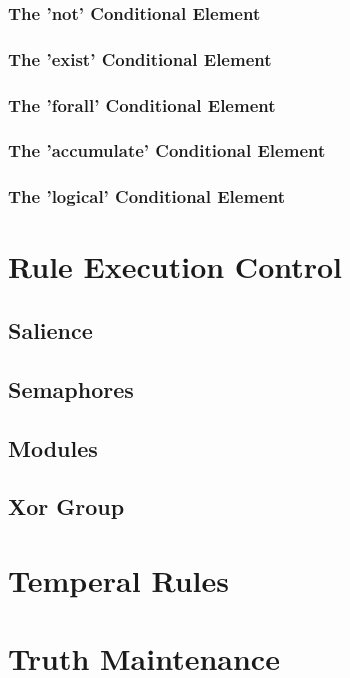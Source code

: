 \subsubsection{The 'not' Conditional Element}
\subsubsection{The 'exist' Conditional Element}
\subsubsection{The 'forall' Conditional Element}
\subsubsection{The 'accumulate' Conditional Element}
\subsubsection{The 'logical' Conditional Element}



\section{Rule Execution Control}
\subsection{Salience}
\subsection{Semaphores}
\subsection{Modules}
\subsection{Xor Group}

\section{Temperal Rules}

\section{Truth Maintenance}
                                                                                     
